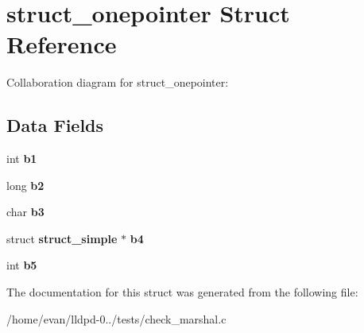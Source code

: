 \section{struct\-\_\-onepointer \-Struct \-Reference}
\label{structstruct__onepointer}


\-Collaboration diagram for struct\-\_\-onepointer\-:
\subsection*{\-Data \-Fields}
\begin{DoxyCompactItemize}
\item 
int {\bfseries b1}\label{structstruct__onepointer_a80a694fb0f4379c31cdb69faf50a4b4a}

\item 
long {\bfseries b2}\label{structstruct__onepointer_ad0f68153652f824d9706f687e3353319}

\item 
char {\bfseries b3}\label{structstruct__onepointer_a0907a369133f8aee503db7ad1be20796}

\item 
struct {\bf struct\-\_\-simple} $\ast$ {\bfseries b4}\label{structstruct__onepointer_a1489a42ecbdd1d0b2c9898fa5a5aca6f}

\item 
int {\bfseries b5}\label{structstruct__onepointer_a652cf756cbd6d5714f973639fa37760a}

\end{DoxyCompactItemize}


\-The documentation for this struct was generated from the following file\-:\begin{DoxyCompactItemize}
\item 
/home/evan/lldpd-\/0../tests/check\-\_\-marshal.\-c\end{DoxyCompactItemize}
